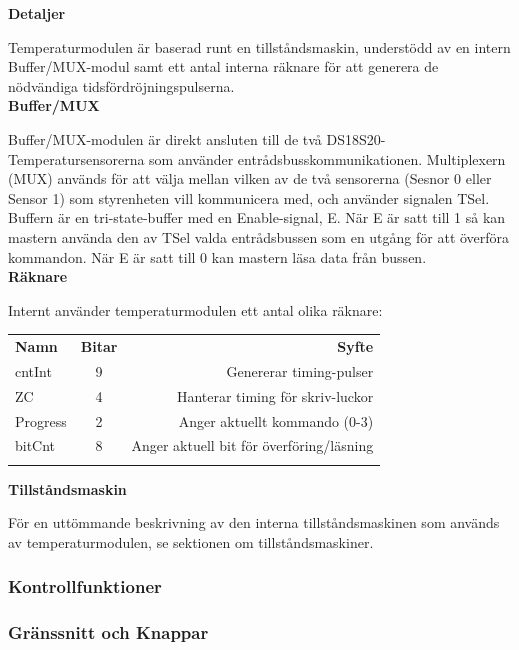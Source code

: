 \documentclass[a4paper,11pt]{article}
\begin{document}
{\noindent \bf Detaljer}

Temperaturmodulen är baserad runt en tillståndsmaskin, understödd av en intern Buffer/MUX-modul samt 
ett antal interna räknare för att generera de nödvändiga tidsfördröjningspulserna.\\

{\noindent \bf Buffer/MUX}

Buffer/MUX-modulen är direkt ansluten till de två DS18S20-Temperatursensorerna som använder entrådsbusskommunikationen.
Multiplexern (MUX) används för att välja mellan vilken av de två sensorerna (Sesnor 0 eller Sensor 1) som styrenheten
vill kommunicera med, och använder signalen TSel.
Buffern är en tri-state-buffer med en Enable-signal, E. När E är satt till 1 så kan mastern använda den av TSel valda
entrådsbussen som en utgång för att överföra kommandon. När E är satt till 0 kan mastern läsa data från bussen.\\

{\noindent \bf Räknare}

Internt använder temperaturmodulen ett antal olika räknare: \\
	\begin{tabular}{l c r}
		\\{\bf Namn} & {\bf Bitar} & {\bf Syfte}\\
		cntInt & 9 & Genererar timing-pulser\\
		ZC & 4 & Hanterar timing för skriv-luckor\\
		Progress & 2 & Anger aktuellt kommando (0-3)\\
		bitCnt & 8 & Anger aktuell bit för överföring/läsning\\\\
	\end{tabular}

{\noindent \bf Tillståndsmaskin}

För en uttömmande beskrivning av den interna tillståndsmaskinen som används av temperaturmodulen,
se sektionen om tillståndsmaskiner.\\

		\subsubsection{Kontrollfunktioner}

		\subsubsection{Gränssnitt och Knappar}
\end{document}
